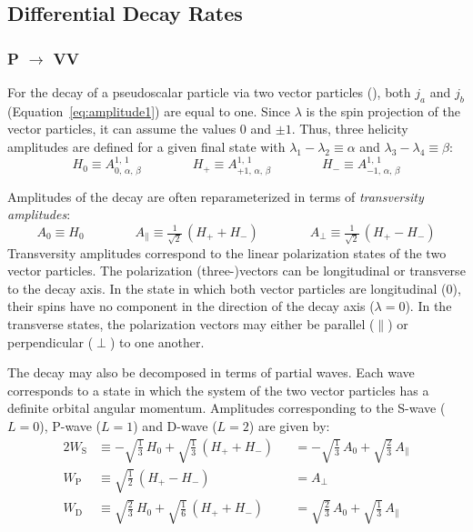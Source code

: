\subsection{Differential Decay Rates} \label{sec:angDiffRates}

\subsubsection{P $\to$ VV} \label{sec:P2VV}
For the decay of a pseudoscalar particle via two vector particles (\PVV), both $j_a$ and $j_b$
(Equation~\ref{eq:amplitude1}) are equal to one. Since $\lambda$ is the spin projection of the
vector particles, it can assume the values 0 and $\pm1$. Thus, three helicity amplitudes are
defined for a given final state with $\lambda_1 - \lambda_2 \equiv \alpha$ and $\lambda_3 -
\lambda_4 \equiv \beta$:
\begin{equation} \label{eq:P2VVHelAmps}
  H_0 \equiv A_{0,\,\alpha,\,\beta}^{1,\,1}
  \qquad\qquad H_+ \equiv A_{+1,\,\alpha,\,\beta}^{1,\,1}
  \qquad\qquad H_- \equiv A_{-1,\,\alpha,\,\beta}^{1,\,1}
\end{equation}

Amplitudes of the \PVV{} decay are often reparameterized in terms of \emph{transversity
amplitudes}:
\begin{equation} \label{eq:P2VVTrAmps}
  A_0 \equiv H_0
  \qquad\qquad A_\parallel \equiv \tfrac{1}{\sqrt{2}}\, (H_+ + H_-)
  \qquad\qquad A_\perp \equiv \tfrac{1}{\sqrt{2}}\, (H_+ - H_-)
\end{equation}
Transversity amplitudes correspond to the linear polarization states of the two vector particles.
The polarization (three-)vectors can be longitudinal or transverse to the decay axis. In the state
in which both vector particles are longitudinal (0), their spins have no component in the direction
of the decay axis ($\lambda=0$). In the transverse states, the polarization vectors may either be
parallel ($\parallel$) or perpendicular ($\perp$) to one another. 

The decay may also be decomposed in terms of partial waves. Each wave corresponds to a state in
which the system of the two vector particles has a definite orbital angular momentum. Amplitudes
corresponding to the S-wave ($L=0$), P-wave ($L=1$) and D-wave ($L=2$) are given by:
\begin{alignat}{2} \label{eq:P2VVPWAmps}
  W_\text{S} &\equiv -\sqrt{\tfrac{1}{3}}\, H_0 + \sqrt{\tfrac{1}{3}}\, (H_+ + H_-)
    && = - \sqrt{\tfrac{1}{3}}\, A_0 + \sqrt{\tfrac{2}{3}}\, A_\parallel
    \nonumber\\
  W_\text{P} &\equiv \sqrt{\tfrac{1}{2}}\, (H_+ - H_-)
    && = A_\perp
    \\
  W_\text{D} &\equiv \sqrt{\tfrac{2}{3}}\, H_0 + \sqrt{\tfrac{1}{6}}\, (H_+ + H_-)
    && = \sqrt{\tfrac{2}{3}}\, A_0 + \sqrt{\tfrac{1}{3}}\, A_\parallel
    \nonumber
\end{alignat}

